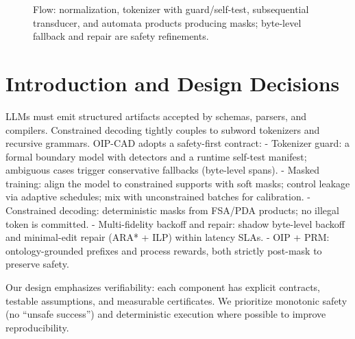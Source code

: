 \documentclass{article}
\begin{document}
\begin{figure}[H]
\centering
{}
\caption{Flow: normalization, tokenizer with guard/self-test, subsequential transducer, and automata products producing masks; byte-level fallback and repair are safety refinements.}
\end{figure}

\section{Introduction and Design Decisions}
LLMs must emit structured artifacts accepted by schemas, parsers, and compilers. Constrained decoding tightly couples to subword tokenizers and recursive grammars. OIP-CAD adopts a safety-first contract:
- Tokenizer guard: a formal boundary model with detectors and a runtime self-test manifest; ambiguous cases trigger conservative fallbacks (byte-level spans).
- Masked training: align the model to constrained supports with soft masks; control leakage via adaptive schedules; mix with unconstrained batches for calibration.
- Constrained decoding: deterministic masks from FSA/PDA products; no illegal token is committed.
- Multi-fidelity backoff and repair: shadow byte-level backoff and minimal-edit repair (ARA* + ILP) within latency SLAs.
- OIP + PRM: ontology-grounded prefixes and process rewards, both strictly post-mask to preserve safety.

Our design emphasizes verifiability: each component has explicit contracts, testable assumptions, and measurable certificates. We prioritize monotonic safety (no “unsafe success”) and deterministic execution where possible to improve reproducibility.
\end{document}
